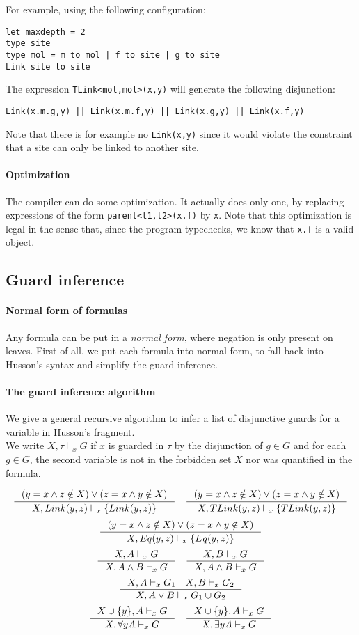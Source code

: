 \documentclass[10pt,a4paper]{article}
\newcommand{\ocaml}{\texttt}
\begin{document}
For example, using the following configuration:
\begin{verbatim}
let maxdepth = 2
type site
type mol = m to mol | f to site | g to site
Link site to site
\end{verbatim}

The expression \ocaml{TLink<mol,mol>(x,y)} will generate the following disjunction:
\begin{verbatim}
Link(x.m.g,y) || Link(x.m.f,y) || Link(x.g,y) || Link(x.f,y)
\end{verbatim}

Note that there is for example no \ocaml{Link(x,y)} since it would violate the constraint that a site can only be linked to another site.

\paragraph{Optimization}
The compiler can do some optimization. It actually does only one, by replacing expressions of the form
\ocaml{parent<t1,t2>(x.f)} by \ocaml{x}.
Note that this optimization is legal in the sense that, since the program typechecks, we know that \ocaml{x.f} is a valid object.

\subsection{Guard inference}
\label{subsec:guardinfer}

\paragraph{Normal form of formulas}
Any formula can be put in a \emph{normal form}, where negation is only present on leaves. First of all, we put each formula into normal form, to fall back into Husson's syntax and simplify the guard inference.

\paragraph{The guard inference algorithm}
We give a general recursive algorithm to infer a list of disjunctive guards for a variable in Husson's fragment.\\
We write $X,\tau \vdash_x G$ if $x$ is guarded in $\tau$ by the disjunction of $g\in G$ and for each $g\in G$, the second variable is not in the forbidden set $X$ nor was quantified in the formula.

\[\inference{(y=x \land z \notin X) \lor (z=x \land y \notin X)}{X, Link(y,z) \vdash_x \{ Link(y,z) \}}  \quad \inference{(y=x \land z \notin X) \lor (z=x \land y \notin X)}{X, TLink(y,z) \vdash_x \{ TLink(y,z)\}}\]
\[\inference{(y=x \land z \notin X) \lor (z=x \land y \notin X)}{X, Eq(y,z) \vdash_x \{ Eq(y,z) \}}\]
\[\inference{X,A \vdash_x G }{X, A\land B \vdash_x G} \quad \inference{X,B \vdash_x G }{X, A\land B \vdash_x G}\]
\[\inference{X,A \vdash_x G_1  \quad X,B \vdash_x G_2}
  {X, A\lor B \vdash_x G_1 \cup G_2}\]
\[\inference{X\cup \{y\},A \vdash_x G }{X, \forall y A \vdash_x G} \quad
\inference{X\cup \{y\},A \vdash_x G }{X, \exists y A \vdash_x G}\]
\end{document}
